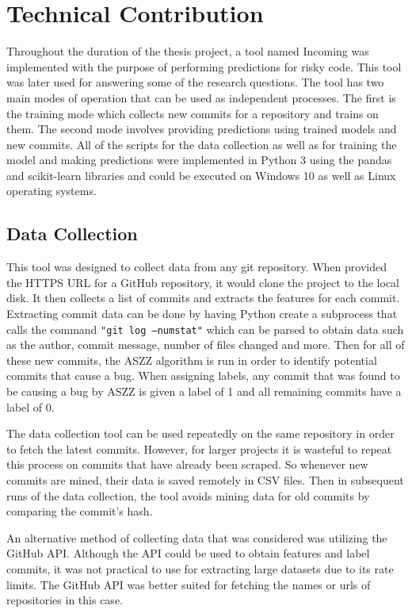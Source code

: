 \documentclass[../main.tex]{subfiles}
\begin{document}
\chapter{Technical Contribution}

Throughout the duration of the thesis project, a tool named Incoming was implemented with the purpose of performing predictions for risky code. This tool was later used for answering some of the research questions. The tool has two main modes of operation that can be used as independent processes. The first is the training mode which collects new commits for a repository and trains on them. The second mode involves providing predictions using trained models and new commits. All of the scripts for the data collection as well as for training the model and making predictions were implemented in Python 3 using the pandas and scikit-learn libraries and could be executed on Windows 10 as well as Linux operating systems. 

\section{Data Collection}

This tool was designed to collect data from any git repository. When provided the HTTPS URL for a GitHub repository, it would clone the project to the local disk. It then collects a list of commits and extracts the features for each commit. Extracting commit data can be done by having Python create a subprocess that calls the command \texttt{"git log --numstat"} which can be parsed to obtain data such as the author, commit message, number of files changed and more. Then for all of these new commits, the ASZZ algorithm is run in order to identify potential commits that cause a bug. When assigning labels, any commit that was found to be causing a bug by ASZZ is given a label of 1 and all remaining commits have a label of 0. 

The data collection tool can be used repeatedly on the same repository in order to fetch the latest commits. However, for larger projects it is wasteful to repeat this process on commits that have already been scraped. So whenever new commits are mined, their data is saved remotely in CSV files. Then in subsequent runs of the data collection, the tool avoids mining data for old commits by comparing the commit's hash. 

An alternative method of collecting data that was considered was utilizing the GitHub API. Although the API could be used to obtain features and label commits, it was not practical to use for extracting large datasets due to its rate limits. The GitHub API was better suited for fetching the names or urls of repositories in this case. 
\end{document}
